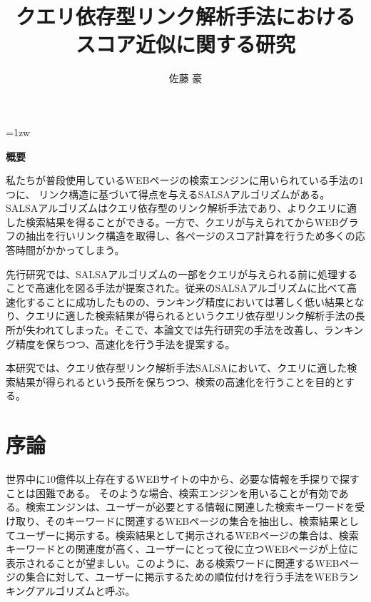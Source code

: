 \documentclass[a4paper,11pt]{jreport}
\title{クエリ依存型リンク解析手法における\\スコア近似に関する研究}
\author{佐藤 豪}
\begin{document}
\maketitle
\thispagestyle{empty}
\newpage

\thispagestyle{empty}
\vspace*{20pt plus 1fil}
\parindent=1zw
\noindent
\begin{center}
{\bf 概要}
\vspace{5mm}
\end{center}
私たちが普段使用しているWEBページの検索エンジンに用いられている手法の1つに、
リンク構造に基づいて得点を与えるSALSAアルゴリズムがある。
SALSAアルゴリズムはクエリ依存型のリンク解析手法であり、よりクエリに適した検索結果を得ることができる。一方で、クエリが与えられてからWEBグラフの抽出を行いリンク構造を取得し、各ページのスコア計算を行うため多くの応答時間がかかってしまう。

先行研究では、SALSAアルゴリズムの一部をクエリが与えられる前に処理することで高速化を図る手法が提案された。従来のSALSAアルゴリズムに比べて高速化することに成功したものの、ランキング精度においては著しく低い結果となり、クエリに適した検索結果が得られるというクエリ依存型リンク解析手法の長所が失われてしまった。そこで、本論文では先行研究の手法を改善し、ランキング精度を保ちつつ、高速化を行う手法を提案する。

本研究では、クエリ依存型リンク解析手法SALSAにおいて、クエリに適した検索結果が得られるという長所を保ちつつ、検索の高速化を行うことを目的とする。

\par
\vspace{0pt plus 1fil}
\newpage

\tableofcontents
\listoffigures

\pagebreak \setcounter{page}{1}


\chapter{序論}

世界中に10億件以上存在するWEBサイトの中から、必要な情報を手探りで探すことは困難である。
そのような場合、検索エンジンを用いることが有効である。検索エンジンは、ユーザーが必要とする情報に関連した検索キーワードを受け取り、そのキーワードに関連するWEBページの集合を抽出し、検索結果としてユーザーに掲示する。検索結果として掲示されるWEBページの集合は、検索キーワードとの関連度が高く、ユーザーにとって役に立つWEBページが上位に表示されることが望ましい。このように、ある検索ワードに関連するWEBページの集合に対して、ユーザーに掲示するための順位付けを行う手法をWEBランキングアルゴリズムと呼ぶ。
\end{document}
